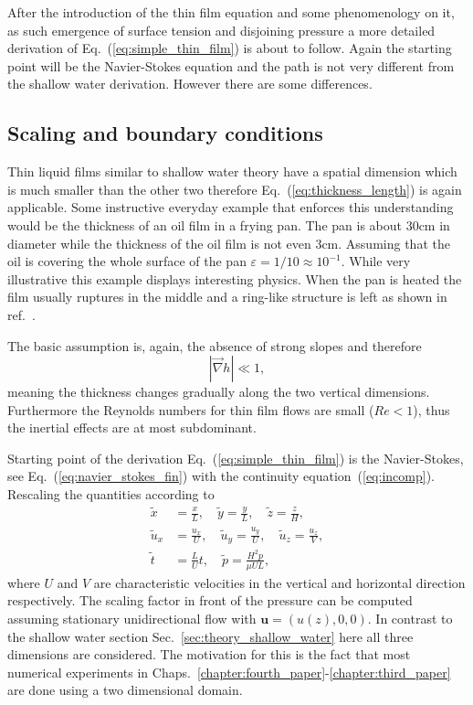 After the introduction of the thin film equation and some phenomenology on it, as such emergence of surface tension and disjoining pressure a more detailed derivation of Eq.~(\ref{eq:simple_thin_film}) is about to follow.
Again the starting point will be the Navier-Stokes equation and the path is not very different from the shallow water derivation.
However there are some differences.

\subsection{Scaling and boundary conditions}
\label{subsec:thin_film_scaling}

Thin liquid films similar to shallow water theory have a spatial dimension which is much smaller than the other two therefore Eq.~(\ref{eq:thickness_length}) is again applicable.
Some instructive everyday example that enforces this understanding would be the thickness of an oil film in a frying pan. 
The pan is about 30cm in diameter while the thickness of the oil film is not even 3cm.
Assuming that the oil is covering the whole surface of the pan $\varepsilon = 1/10 \approx 10^{-1}$.
While very illustrative this example displays interesting physics.
When the pan is heated the film usually ruptures in the middle and a ring-like structure is left as shown in ref.~\cite{doi:10.1063/5.0035547}.

The basic assumption is, again, the absence of strong slopes and therefore
\begin{equation}\label{eq:small_slopes}
    |\vec{\nabla} h| \ll 1,  
\end{equation}
meaning the thickness changes gradually along the two vertical dimensions.
Furthermore the Reynolds numbers for thin film flows are small ($Re < 1$), thus the inertial effects are at most subdominant.

Starting point of the derivation Eq.~(\ref{eq:simple_thin_film}) is the Navier-Stokes, see Eq.~(\ref{eq:navier_stokes_fin}) with the continuity equation~(\ref{eq:incomp}).
Rescaling the quantities according to 
\begin{align}\label{eq:thin_film_scaling}
    \tilde{x} &= \frac{x}{L},\quad \tilde{y} = \frac{y}{L},\quad \tilde{z} = \frac{z}{H},\nonumber \\
    \tilde{u}_x &= \frac{u_x}{U},\quad \tilde{u}_y = \frac{u_y}{U},\quad \tilde{u}_z = \frac{u_z}{V},\nonumber \\
    \tilde{t} &= \frac{L}{U} t,\quad \tilde{p} = \frac{H^2 p}{\mu U L}, 
\end{align}
where $U$ and $V$ are characteristic velocities in the vertical and horizontal direction respectively. 
The scaling factor in front of the pressure can be computed assuming stationary unidirectional flow with $\mathbf{u} = (u(z), 0, 0)$.
In contrast to the shallow water section Sec.~\ref{sec:theory_shallow_water} here all three dimensions are considered.
The motivation for this is the fact that most numerical experiments in Chaps.~\ref{chapter:fourth_paper}-\ref{chapter:third_paper} are done using a two dimensional domain. 
 
